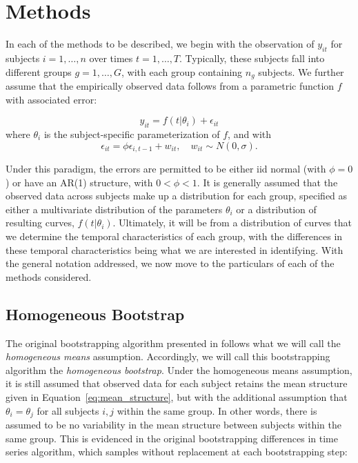 \documentclass{article}
\begin{document}
\section{Methods}

In each of the methods to be described, we begin with the observation of $y_{it}$ for subjects $i = 1, \dots, n$ over times $t = 1, \dots, T$. Typically, these subjects fall into different groups $g = 1, \dots, G$, with each group containing $n_g$ subjects. We further assume that the empirically observed data follows from a parametric function $f$ with associated error:

\begin{equation}\label{eq:mean_structure}
y_{it} = f(t|\theta_i) + \epsilon_{it}
\end{equation}
where $\theta_i$ is the subject-specific parameterization of $f$, and with
\begin{equation}
\epsilon_{it} = \phi \epsilon_{i, t-1} + w_{it}, \quad w_{it} \sim N(0, \sigma).
\end{equation}

Under this paradigm, the errors are permitted to be either iid normal (with $\phi = 0$) or have an AR(1) structure, with $0 < \phi < 1$. It is generally assumed that the observed data across subjects make up a distribution for each group, specified as either a multivariate distribution of the parameters $\theta_i$ or a distribution of resulting curves, $f(t|\theta_i)$. Ultimately, it will be from a distribution of curves that we determine the temporal characteristics of each group, with the differences in these temporal characteristics being what we are interested in identifying. With the general notation addressed, we now move to the particulars of each of the methods considered.

\subsection{Homogeneous Bootstrap}

The original bootstrapping algorithm presented in \citet{oleson2017detecting} follows what we will call the \textit{homogeneous means} assumption. Accordingly, we will call this bootstrapping algorithm the \textit{homogeneous bootstrap}. Under the homogeneous means assumption, it is still assumed that observed data for each subject retains the mean structure given in Equation~\ref{eq:mean_structure}, but with the additional assumption that $\theta_i = \theta_j$ for all subjects $i, j$ within the same group. In other words, there is assumed to be no variability in the mean structure between subjects within the same group. This is evidenced in the original bootstrapping differences in time series algorithm, which samples without replacement at each bootstrapping step:
\end{document}
